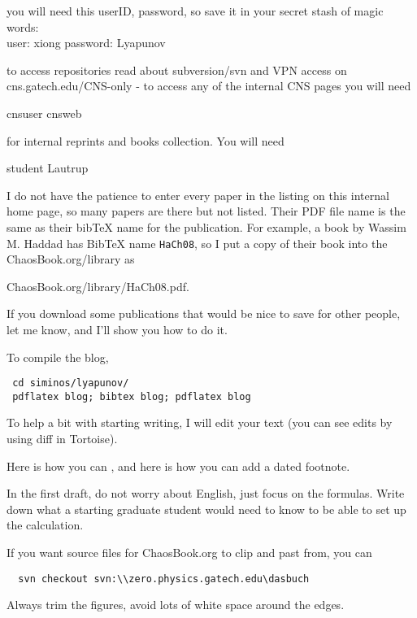 \begin{description}
you will
need this userID, password, so save it in your secret stash of magic
words:
\\
user: xiong  password: Lyapunov

to access repositories read about subversion/svn and VPN access on
 {cns.gatech.edu/CNS-only} - to
access any of the internal CNS pages you will need

cnsuser           cnsweb

 for internal reprints and
books collection. You will need

student           Lautrup

I do not have the patience to enter every paper in the listing on this
internal home page, so many papers are there but not listed. Their PDF
file name is the same as their bibTeX name for the publication. For
example, a book by Wassim M. Haddad has BibTeX name
\texttt{HaCh08}, so I put a copy of their book into the
ChaosBook.org/library as

{ChaosBook.org/library/HaCh08.pdf}.

If you download some publications that would be nice to save for other
people, let me know, and I'll show you how to do it.

To compile the blog,
\begin{verbatim}
 cd siminos/lyapunov/
 pdflatex blog; bibtex blog; pdflatex blog
\end{verbatim}

To help a bit with starting writing, I will
edit your text (you can see edits by using diff in Tortoise).

Here is how you can
, and here is how you can add a dated
footnote.

In the first draft, do not worry about
English, just focus on the formulas. Write
down what a starting graduate student would need to know to be able
to set up the calculation.

If you want source files for ChaosBook.org to clip and past from, you can
\begin{verbatim}
  svn checkout svn:\\zero.physics.gatech.edu\dasbuch
\end{verbatim}

Always trim the figures, avoid lots of white
space around the edges.


\end{description}
